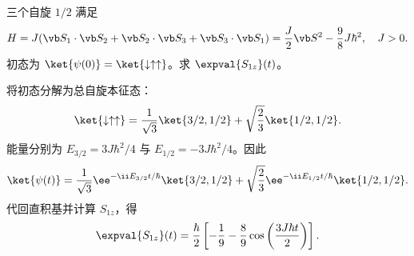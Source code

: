 \begin{question}
三个自旋 $1/2$ 满足
\[
  H=J(\vb S_1\cdot\vb S_2+\vb S_2\cdot\vb S_3+\vb S_3\cdot\vb S_1)
  ={J\over2}\vb S^2-{9\over8}J\hbar^2,\quad J>0.
\]
初态为 $\ket{\psi(0)}=\ket{\downarrow\uparrow\uparrow}$。求 $\expval{S_{1z}}(t)$。
\begin{solution}
将初态分解为总自旋本征态：
\[
  \ket{\downarrow\uparrow\uparrow}
  ={1\over\sqrt3}\ket{3/2,1/2}
  +\sqrt{2\over3}\ket{1/2,1/2}.
\]
能量分别为 $E_{3/2}=3J\hbar^2/4$ 与 $E_{1/2}=-3J\hbar^2/4$。因此
\[
  \ket{\psi(t)}={1\over\sqrt3}\ee^{-\ii E_{3/2}t/\hbar}\ket{3/2,1/2}
  +\sqrt{2\over3}\ee^{-\ii E_{1/2}t/\hbar}\ket{1/2,1/2}.
\]
代回直积基并计算 $S_{1z}$，得
\[
  \expval{S_{1z}}(t)={\hbar\over2}\left[-{1\over9}
  -{8\over9}\cos\left({3J\hbar t\over2}\right)\right].
\]
\end{solution}
\end{question}
